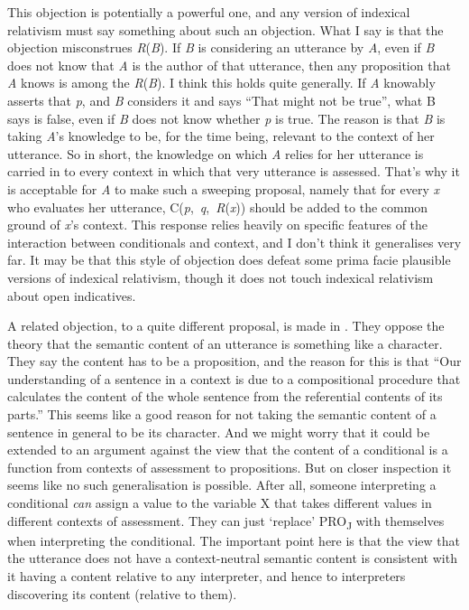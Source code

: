 This objection is potentially a powerful one, and any version of indexical relativism must say something about such an objection. What I say is that the objection misconstrues \textit{R}(\textit{B}). If \textit{B} is considering an utterance by \textit{A}, even if \textit{B} does not know that \textit{A} is the author of that utterance, then any proposition that \textit{A} knows is among the \textit{R}(\textit{B}). I think this holds quite generally. If \textit{A} knowably asserts that \textit{p}, and \textit{B} considers it and says ``That might not be true'', what B says is false, even if \textit{B} does not know whether \textit{p} is true. The reason is that \textit{B} is taking \textit{A}'s knowledge to be, for the time being, relevant to the context of her utterance. So in short, the knowledge on which \textit{A} relies for her utterance is carried in to every context in which that very utterance is assessed. That's why it is acceptable for \textit{A} to make such a sweeping proposal, namely that for every \textit{x} who evaluates her utterance, C(\textit{p},~\textit{q},~\textit{R}(\textit{x})) should be added to the common ground of \textit{x}'s context. This response relies heavily on specific features of the interaction between conditionals and context, and I don't think it generalises very far. It may be that this style of objection does defeat some prima facie plausible versions of indexical relativism, though it does not touch indexical relativism about open indicatives.

A related objection, to a quite different proposal, is made in \cite{KingStanley2005}. They oppose the theory that the semantic content of an utterance is something like a character. They say the content has to be a proposition, and the reason for this is that ``Our understanding of a sentence in a context is due to a compositional procedure that calculates the content of the whole sentence from the referential contents of its parts.'' This seems like a good reason for not taking the semantic content of a sentence in general to be its character. And we might worry that it could be extended to an argument against the view that the content of a conditional is a function from contexts of assessment to propositions. But on closer inspection it seems like no such generalisation is possible. After all, someone interpreting a conditional \textit{can} assign a value to the variable X that takes different values in different contexts of assessment. They can just `replace' PRO\textsubscript{J} with themselves when interpreting the conditional. The important point here is that the view that the utterance does not have a context-neutral semantic content is consistent with it having a content relative to any interpreter, and hence to interpreters discovering its content (relative to them).

